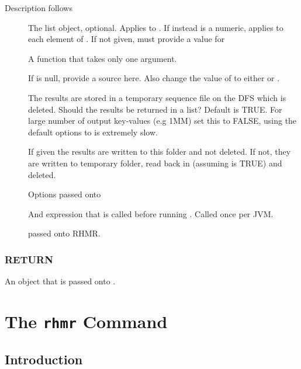 \documentclass[letterpaper,10pt,english]{manual}
\begin{document}
Description follows
\begin{description}
\item[]
The list object, optional. Applies  to  .
If instead  is a numeric, applies  to each element of
. If not given, must provide a value for 

\item[]
A function that takes only one argument.

\item[]
If  is null, provide a source here. Also change the value of
 to either  or .

\item[]
The results are stored in a temporary sequence file on the DFS which is
deleted. Should the results be returned in a list? Default is TRUE. For
large number of output key-values (e.g 1MM) set this to FALSE, using the
default options to  is extremely slow.

\item[]
If given the results are written to this folder and not deleted. If not,
they are written to temporary folder, read back in (assuming 
is TRUE) and deleted.

\item[]
Options passed onto 

\item[]
And expression that is called before running . Called once per
JVM.

\item[]
passed onto RHMR.

\end{description}


\subsection{RETURN}

An object that is passed onto .

\resetcurrentobjects
\hypertarget{--doc-rhmr}{}

\chapter{The \texttt{rhmr} Command}


\section{Introduction}
\end{document}
